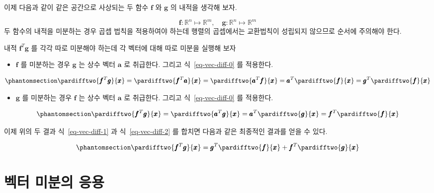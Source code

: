 \documentclass[
  11pt,
  a4paper,
  oneside]{scrbook}
\providecommand{\tightlist}{%
  \setlength{\itemsep}{0pt}\setlength{\parskip}{0pt}}\usepackage{longtable,booktabs,array}
\newcommand{\RR}{\mathbb{R}}
\theoremstyle{definition}
\theoremstyle{definition}
\theoremstyle{plain}
\theoremstyle{remark}
\begin{document}
이제 다음과 같이 같은 공간으로 사상되는 두 함수 \(\pmb f\) 와 \(\pmb g\)
의 내적을 생각해 보자.

\[ \pmb f : \RR^n \mapsto \RR^m, \quad \pmb g : \RR^n \mapsto \RR^m\] 두
함수의 내적을 미분하는 경우 곱셉 법칙을 적용하여야 하는데 행렬의
곱셉에서는 교환법칙이 성립되지 않으므로 순서에 주의해야 한다.

내적 \(\pmb f^T \pmb g\) 를 각각 따로 미분해야 하는데 각 벡터에 대해
따로 미분을 실행해 보자

\begin{itemize}
\tightlist
\item
  \(\pmb f\) 를 미분하는 경우 \(\pmb g\) 는 상수 벡터 \(\pmb a\) 로
  취급한다. 그리고 식~\ref{eq-vec-diff-0} 를 적용한다.
\end{itemize}

\begin{equation}\phantomsection\label{eq-vec-diff-1}{
\pardifftwo{ \pmb f^T \pmb g}{\pmb x} = \pardifftwo{ \pmb f^T \pmb a}{\pmb x} = 
\pardifftwo{ \pmb a^T \pmb f}{\pmb x} = \pmb a^T \pardifftwo{ \pmb f}{\pmb x} =
\pmb g^T \pardifftwo{ \pmb f}{\pmb x} 
}\end{equation}

\begin{itemize}
\tightlist
\item
  \(\pmb g\) 를 미분하는 경우 \(\pmb f\) 는 상수 벡터 \(\pmb a\) 로
  취급한다. 그리고 식~\ref{eq-vec-diff-0} 를 적용한다.
\end{itemize}

\begin{equation}\phantomsection\label{eq-vec-diff-2}{
\pardifftwo{ \pmb f^T \pmb g}{\pmb x} = \pardifftwo{ \pmb a^T \pmb g}{\pmb x} = 
 \pmb a^T \pardifftwo{ \pmb g}{\pmb x} =
\pmb f^T \pardifftwo{ \pmb f}{\pmb x} 
}\end{equation}

이제 위의 두 결과 식~\ref{eq-vec-diff-1} 과 식~\ref{eq-vec-diff-2} 를
합치면 다음과 같은 최종적인 결과를 얻을 수 있다.

\begin{equation}\phantomsection\label{eq-vec-diff-prod}{
\pardifftwo{ \pmb f^T \pmb g}{\pmb x} = \pmb g^T \pardifftwo{ \pmb f}{\pmb x} + \pmb f^T \pardifftwo{ \pmb g}{\pmb x} 
}\end{equation}

\section{벡터 미분의
응용}\label{uxbca1uxd130-uxbbf8uxbd84uxc758-uxc751uxc6a9}
\end{document}
